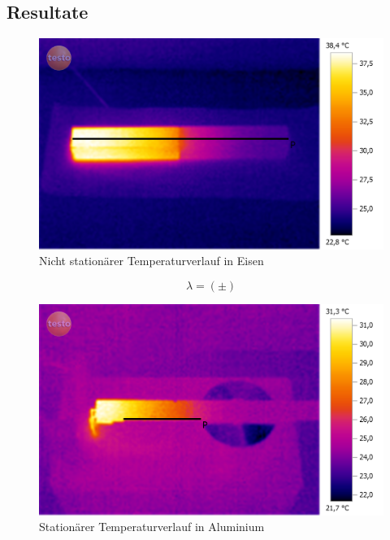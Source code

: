 \documentclass[12pt,a4paper]{article}
\begin{document}
\begin{multicols}{2}
\subsection{Resultate}

\begin{figure}[H]
	\centering
	\includegraphics[scale=0.12]{./BilderCorrect/Versuch_1_gradient_60.png}
	\caption{Nicht stationärer Temperaturverlauf in Eisen}
	\label{fig:nicht_stat_verlauf}
\end{figure}

$$\lambda = ( \pm )$$
\begin{figure}[H]
	\centering
	\includegraphics[scale=0.12]{./BilderCorrect/Versuch_1_stationaer_roh.png}
	\caption{Stationärer Temperaturverlauf in Aluminium}
	\label{fig:stat_verlauf}
\end{figure}

\end{multicols}
\end{document}
